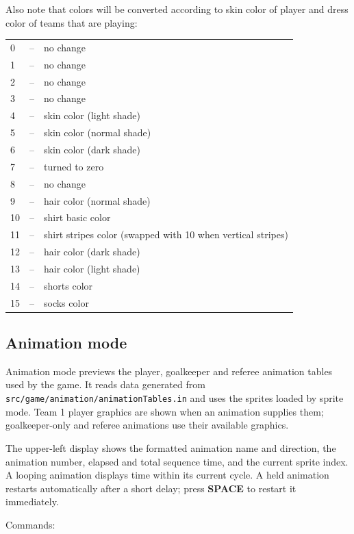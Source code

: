 \documentclass[a4paper,12pt]{article}
\begin{document}
Also note that colors will be converted according to skin color of player and
dress color of teams that are playing:

\begin{tabular}{lll}
 0 &--& no change\\
 1 &--& no change\\
 2 &--& no change\\
 3 &--& no change\\
 4 &--& skin color (light shade)\\
 5 &--& skin color (normal shade)\\
 6 &--& skin color (dark shade)\\
 7 &--& turned to zero\\
 8 &--& no change\\
 9 &--& hair color (normal shade)\\
10 &--& shirt basic color\\
11 &--& shirt stripes color (swapped with 10 when vertical stripes)\\
12 &--& hair color (dark shade)\\
13 &--& hair color (light shade)\\
14 &--& shorts color\\
15 &--& socks color
\end{tabular}

\newpage
\subsection{Animation mode}

Animation mode previews the player, goalkeeper and referee animation tables
used by the game. It reads data generated from
\verb|src/game/animation/animationTables.in| and uses the sprites loaded by
sprite mode. Team 1 player graphics are shown when an animation supplies them;
goalkeeper-only and referee animations use their available graphics.

The upper-left display shows the formatted animation name and direction, the
animation number, elapsed and total sequence time, and the current sprite
index. A looping animation displays time within its current cycle. A held
animation restarts automatically after a short delay; press {\bf SPACE} to
restart it immediately.

\vspace{\baselineskip}
\noindent Commands:
\vspace{\baselineskip}
\end{document}
